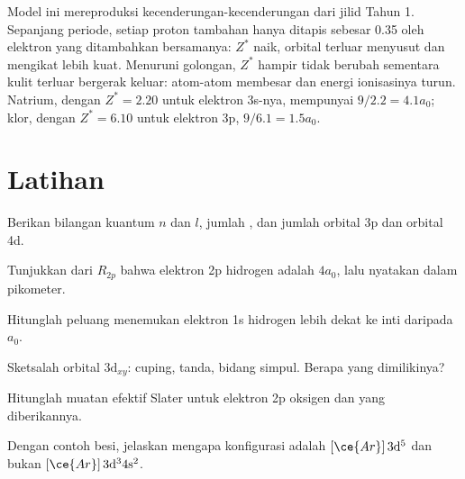 Model ini mereproduksi kecenderungan-kecenderungan dari jilid Tahun 1.
Sepanjang periode, setiap proton tambahan hanya ditapis sebesar 0.35 oleh
elektron yang ditambahkan bersamanya: $Z^*$ naik, orbital terluar menyusut
dan mengikat lebih kuat. Menuruni golongan, $Z^*$ hampir tidak berubah
sementara kulit terluar bergerak keluar: atom-atom membesar dan energi
ionisasinya turun. Natrium, dengan $Z^* = 2.20$ untuk elektron 3s-nya,
mempunyai  $9/2.2 = 4.1a_0$; klor, dengan $Z^* = 6.10$
untuk elektron 3p, $9/6.1 = 1.5a_0$.

\section{Latihan}

\begin{exercise}[$\star$]\label{exo:b2:atomic-orbitals:1}
Berikan bilangan kuantum $n$ dan $l$, jumlah , dan jumlah
 orbital 3p dan orbital 4d.
\end{exercise}

\begin{exercise}[$\star$]\label{exo:b2:atomic-orbitals:2}
Tunjukkan dari $R_{2p}$ bahwa  elektron 2p hidrogen
adalah $4a_0$, lalu nyatakan dalam pikometer.
\end{exercise}

\begin{exercise}[$\star$]\label{exo:b2:atomic-orbitals:3}
Hitunglah peluang menemukan elektron 1s hidrogen lebih dekat ke inti
daripada $a_0$.
\end{exercise}

\begin{exercise}[$\star$]\label{exo:b2:atomic-orbitals:4}
Sketsalah orbital $3\mathrm d_{xy}$: cuping, tanda, bidang simpul. Berapa
 yang dimilikinya?
\end{exercise}

\begin{exercise}[$\star\star$]\label{exo:b2:atomic-orbitals:5}
Hitunglah muatan efektif Slater untuk elektron 2p oksigen dan  yang diberikannya.
\end{exercise}

\begin{exercise}[$\star\star$]\label{exo:b2:atomic-orbitals:6}
Dengan contoh besi, jelaskan mengapa konfigurasi  adalah
$[\ce{Ar}]\,3\mathrm d^5$ dan bukan $[\ce{Ar}]\,3\mathrm d^3 4\mathrm s^2$.
\end{exercise}


